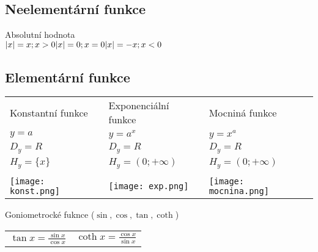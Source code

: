 \subsection*{Neelementární funkce}
Absolutní hodnota \\
\(
    \lvert x\rvert = x ; x > 0 \\
    \lvert x\rvert = 0 ; x = 0 \\
    \lvert x\rvert = -x ; x < 0
\)
    \subsection*{Elementární funkce}
\begin{tabular}{p{6cm} p{6cm} p{6cm}}
    Konstantní funkce & Exponenciální funkce & Mocniná funkce \\
    $y = a$ & $y = a^x$ & $y = x^a$ \\
    $D_y=R$ & $D_y = R$ & $D_y = R$ \\
    $H_y = \{x\}$ & $H_y = (0;+\infty)$ & $H_y = (0;+\infty)$ \\ \\
    \texttt{[image: konst.png]}&
    \texttt{[image: exp.png]}&
    \texttt{[image: mocnina.png]} \\

\end{tabular}

Goniometrocké fuknce
($\sin{},\cos{},\tan{}, \coth{}$)
 
\begin{center}
    \begin{tabular}{p{5cm} p{5cm}}
        \(\tan{x}=\frac{\sin{x}}{\cos{x}} \)&
        \(\coth{x}=\frac{\cos{x}}{\sin{x}} \) \\
    \end{tabular}
\end{center}
